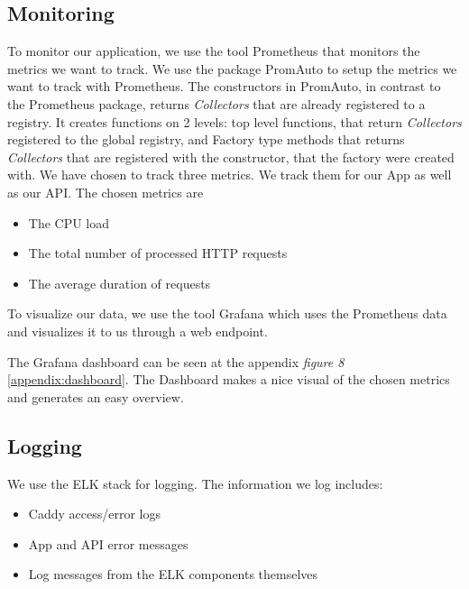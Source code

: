 \subsection{Monitoring}\label{Monitoring}

To monitor our application, we use the tool Prometheus that monitors the metrics we want to track. 
We use the package PromAuto to setup the metrics we want to track with Prometheus. The constructors in PromAuto, in contrast to the Prometheus package, returns \textit{Collectors} that are already registered to a registry. It creates functions on 2 levels: top level functions, that return \textit{Collectors} registered to the global registry, and Factory type methods that returns \textit{Collectors} that are registered with the constructor, that the factory were created with.
\newline
We have chosen to track three metrics. We track them for our App as well as our API. The chosen metrics are
\begin{itemize}
    \item The CPU load
    \item The total number of processed HTTP requests
    \item The average duration of requests
\end{itemize}


To visualize our data, we use the tool Grafana which uses the Prometheus data and visualizes it to us through a web endpoint.

The Grafana dashboard can be seen at the appendix \textit{figure 8} \ref{appendix:dashboard}. The Dashboard makes a nice visual of the chosen metrics and generates an easy overview.

\subsection{Logging}
We use the ELK stack for logging. The information we log includes:

\begin{itemize}
    \item Caddy access/error logs
    \item App and API error messages
    \item Log messages from the ELK components themselves
\end{itemize}

